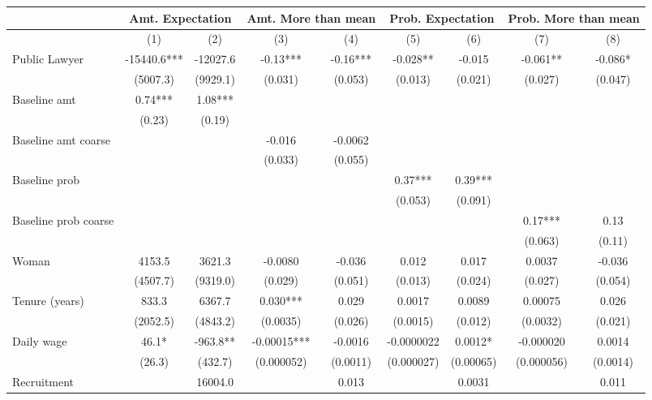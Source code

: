 \begin{tabular}{lcccccccc}
\toprule
      & \multicolumn{2}{c}{Amt. Expectation} & \multicolumn{2}{c}{Amt. More than mean} & \multicolumn{2}{c}{Prob. Expectation} & \multicolumn{2}{c}{Prob. More than mean} \\
\midrule
\midrule
      & (1)   & (2)   & (3)   & (4)   & (5)   & (6)   & (7)   & (8) \\
\midrule
\midrule
Public Lawyer & -15440.6*** & -12027.6 & -0.13*** & -0.16*** & -0.028** & -0.015 & -0.061** & -0.086* \\
      & (5007.3) & (9929.1) & (0.031) & (0.053) & (0.013) & (0.021) & (0.027) & (0.047) \\
Baseline amt   & 0.74*** & 1.08*** &       &       &       &       &       &  \\
      & (0.23) & (0.19) &       &       &       &       &       &  \\
Baseline amt coarse &       &       & -0.016 & -0.0062 &       &       &       &  \\
      &       &       & (0.033) & (0.055) &       &       &       &  \\
Baseline prob &       &       &       &       & 0.37*** & 0.39*** &       &  \\
      &       &       &       &       & (0.053) & (0.091) &       &  \\
Baseline prob coarse &       &       &       &       &       &       & 0.17*** & 0.13 \\
      &       &       &       &       &       &       & (0.063) & (0.11) \\
Woman & 4153.5 & 3621.3 & -0.0080 & -0.036 & 0.012 & 0.017 & 0.0037 & -0.036 \\
      & (4507.7) & (9319.0) & (0.029) & (0.051) & (0.013) & (0.024) & (0.027) & (0.054) \\
Tenure (years) & 833.3 & 6367.7 & 0.030*** & 0.029 & 0.0017 & 0.0089 & 0.00075 & 0.026 \\
      & (2052.5) & (4843.2) & (0.0035) & (0.026) & (0.0015) & (0.012) & (0.0032) & (0.021) \\
Daily wage & 46.1* & -963.8** & -0.00015*** & -0.0016 & -0.0000022 & 0.0012* & -0.000020 & 0.0014 \\
      & (26.3) & (432.7) & (0.000052) & (0.0011) & (0.000027) & (0.00065) & (0.000056) & (0.0014) \\
Recruitment &       & 16004.0 &       & 0.013 &       & 0.0031 &       & 0.011 \\

\end{tabular}
